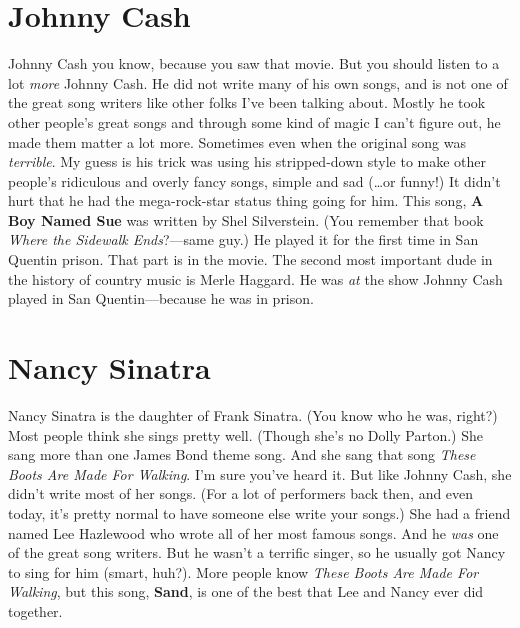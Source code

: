\documentclass[letterpaper,single]{article}
\begin{document}
\section{Johnny Cash}
Johnny Cash you know, because you saw that movie. But you should listen
to a lot \emph{more} Johnny Cash. He did not write many of his own
songs, and is not one of the great song writers like other folks I've
been talking about. Mostly he took other people's great songs and
through some kind of magic I can't figure out, he made them matter a
lot more. Sometimes even when the original song was \emph{terrible}.
My guess is his trick was using his stripped-down style to make other
people's ridiculous and overly fancy songs, simple and sad (\ldots or
funny!) It didn't hurt that he had the mega-rock-star status thing
going for him. This song, \textbf{A Boy Named Sue} was written by
Shel Silverstein. (You remember that book \emph{Where the Sidewalk
Ends}?---same guy.) He played it for the first time in San Quentin
prison. That part is in the movie. The second most important dude in the
history of country music is Merle Haggard. He was \emph{at} the show
Johnny Cash played in San Quentin---because he was in prison.

\section{Nancy Sinatra}
Nancy Sinatra is the daughter of Frank Sinatra. (You know who he was,
right?) Most people think she sings pretty well. (Though she's no Dolly
Parton.) She sang more than one James Bond theme song. And she sang that
song \emph{These Boots Are Made For Walking}. I'm sure you've heard it.
But like Johnny Cash, she didn't write most of her songs. (For a lot of
performers back then, and even today, it's pretty normal to have someone
else write your songs.) She had a friend named Lee Hazlewood who wrote
all of her most famous songs. And he \emph{was} one of the great song
writers. But he wasn't a terrific singer, so he usually got Nancy to
sing for him (smart, huh?). More people know \emph{These Boots Are Made
For Walking}, but this song, \textbf{Sand}, is one of the best that Lee
and Nancy ever did together.
\end{document}
